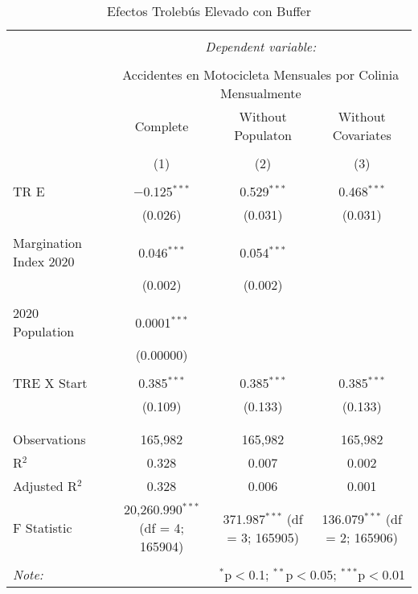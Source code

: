 
\begin{table}[!htbp] \centering 
  \caption{Efectos Trolebús Elevado con Buffer} 
  \label{} 
\begin{tabular}{@{\extracolsep{5pt}}lccc} 
\\[-1.8ex]\hline 
\hline \\[-1.8ex] 
 & \multicolumn{3}{c}{\textit{Dependent variable:}} \\ 
\cline{2-4} 
\\[-1.8ex] & \multicolumn{3}{c}{Accidentes en Motocicleta Mensuales por Colinia Mensualmente} \\ 
 & Complete & Without Populaton & Without Covariates \\ 
\\[-1.8ex] & (1) & (2) & (3)\\ 
\hline \\[-1.8ex] 
 TR E & $-$0.125$^{***}$ & 0.529$^{***}$ & 0.468$^{***}$ \\ 
  & (0.026) & (0.031) & (0.031) \\ 
  & & & \\ 
 Margination Index 2020 & 0.046$^{***}$ & 0.054$^{***}$ &  \\ 
  & (0.002) & (0.002) &  \\ 
  & & & \\ 
 2020 Population & 0.0001$^{***}$ &  &  \\ 
  & (0.00000) &  &  \\ 
  & & & \\ 
 TRE X Start & 0.385$^{***}$ & 0.385$^{***}$ & 0.385$^{***}$ \\ 
  & (0.109) & (0.133) & (0.133) \\ 
  & & & \\ 
\hline \\[-1.8ex] 
Observations & 165,982 & 165,982 & 165,982 \\ 
R$^{2}$ & 0.328 & 0.007 & 0.002 \\ 
Adjusted R$^{2}$ & 0.328 & 0.006 & 0.001 \\ 
F Statistic & 20,260.990$^{***}$ (df = 4; 165904) & 371.987$^{***}$ (df = 3; 165905) & 136.079$^{***}$ (df = 2; 165906) \\ 
\hline 
\hline \\[-1.8ex] 
\textit{Note:}  & \multicolumn{3}{r}{$^{*}$p$<$0.1; $^{**}$p$<$0.05; $^{***}$p$<$0.01} \\ 
\end{tabular} 
\end{table} 
